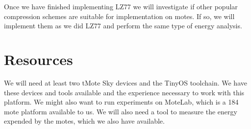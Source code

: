\documentclass[10pt]{article}
\begin{document}
Once we have finished implementing LZ77 we will investigate if other
popular compression schemes are suitable for implementation on
motes. If so, we will implement them as we did LZ77 and perform the
same type of energy analysis.

\section{Resources}

We will need at least two tMote Sky devices and the TinyOS
toolchain. We have these devices and tools available and the
experience necessary to work with this platform. We might also want to
run experiments on MoteLab, which is a 184 mote platform available to
us. We will also need a tool to measure the energy expended by the
motes, which we also have available. 



\end{document}
